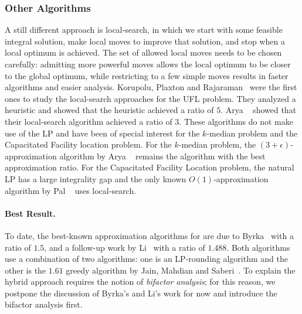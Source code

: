 \documentclass[oneside,final]{ucr}
\begin{document}
\subsubsection{Other Algorithms}
A still different approach is local-search, in which we
start with some feasible integral solution, make local moves
to improve that solution, and stop when a local optimum is
achieved. The set of allowed local moves needs to be chosen
carefully: admitting more powerful moves allows the local
optimum to be closer to the global optimum, while
restricting to a few simple moves results in faster
algorithms and easier analysis. Korupolu, Plaxton and
Rajaraman~\cite{KorupoluPR98} were the first ones to study
the local-search approaches for the UFL problem. They
analyzed a heuristic and showed that the heuristic achieved
a ratio of $5$.  Arya {\etal}~\cite{AryaGKMMP01} showed that
their local-search algorithm achieved a ratio of $3$. These
algorithms do not make use of the LP and have been of
special interest for the $k$-median problem and the
Capacitated Facility location problem. For the $k$-median
problem, the $(3+\epsilon)$-approximation algorithm by Arya
{\etal}~\cite{AryaGKMMP01} remains the algorithm with the
best approximation ratio. For the Capacitated Facility
Location problem, the natural LP has a large integrality gap
and the only known $O(1)$-approximation algorithm by Pal
{\etal}~\cite{PalTW01} uses local-search.

\paragraph{Best Result.} To date, the best-known
approximation algorithms for {\UFL} are due to
Byrka~\cite{Byrka07} with a ratio of $1.5$, and a follow-up
work by Li~\cite{Li11} with a ratio of $1.488$. Both
algorithms use a combination of two algorithms: one is an
LP-rounding algorithm and the other is the $1.61$ greedy
algorithm by Jain, Mahdian and Saberi~\cite{JainMS02}. To
explain the hybrid approach requires the notion of
\emph{bifactor analysis}; for this reason, we postpone the
discussion of Byrka's and Li's work for now and introduce
the bifactor analysis first.
\end{document}
